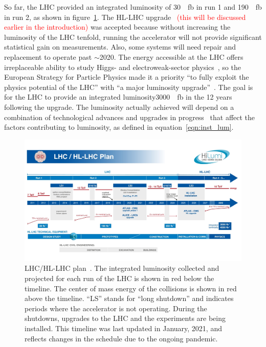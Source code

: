 So far, the LHC provided an integrated luminosity of \SI{30}{\per\femto\barn} in run 1 and \SI{190}{\per\femto\barn} in run 2, as shown in figure~\ref{fig:hl-lhc}. The HL-LHC upgrade~\cite{hl_lhc_tdr} \textcolor{red}{(this will be discussed earlier in the introduction)} was accepted because without increasing the luminosity of the LHC tenfold, running the accelerator will not provide significant statistical gain on measurements. Also, some systems will need repair and replacement to operate past $\sim$2020. The energy accessible at the LHC offers irreplaceable ability to study Higgs- and electroweak-sector physics~\cite{dainese_physics_2018}, so the European Strategy for Particle Physics made it a priority ``to fully exploit the physics potential of the LHC'' with ``a major luminosity upgrade''~\cite{european_strategy_for_particle_physics}. The goal is for the LHC to provide an integrated luminosity\SI{3000}{\per\femto\barn} in the 12 years following the upgrade. The luminosity actually achieved will depend on a combination of technological advances and upgrades in progress~\cite{hl_lhc_tdr} that affect the factors contributing to luminosity, as defined in equation~\ref{eqn:inst_lum}.


\begin{figure}
    \centering
    \includegraphics[width = \textwidth]{figures/HL-LHC-updated-January-2021_small.jpg}
    \caption{LHC/HL-LHC plan~\cite{hl-lhc_plan_picture_website}. The integrated luminosity collected and projected for each run of the LHC is shown in red below the timeline. The center of mass energy of the collisions is shown in red above the timeline. ``LS'' stands for ``long shutdown'' and indicates periods where the accelerator is not operating. During the shutdowns, upgrades to the LHC and the experiments are being installed. This timeline was last updated in January, 2021, and reflects changes in the schedule due to the ongoing pandemic. }
    \label{fig:hl-lhc}
\end{figure}

